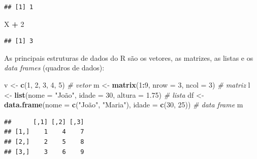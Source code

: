 \documentclass[
]{book}
\newenvironment{Shaded}{\begin{snugshade}}{\end{snugshade}}
\newcommand{\AttributeTok}[1]{\textcolor[rgb]{0.13,0.29,0.53}{#1}}
\newcommand{\CommentTok}[1]{\textcolor[rgb]{0.56,0.35,0.01}{\textit{#1}}}
\newcommand{\DecValTok}[1]{\textcolor[rgb]{0.00,0.00,0.81}{#1}}
\newcommand{\FloatTok}[1]{\textcolor[rgb]{0.00,0.00,0.81}{#1}}
\newcommand{\FunctionTok}[1]{\textcolor[rgb]{0.13,0.29,0.53}{\textbf{#1}}}
\newcommand{\NormalTok}[1]{#1}
\newcommand{\OtherTok}[1]{\textcolor[rgb]{0.56,0.35,0.01}{#1}}
\newcommand{\SpecialCharTok}[1]{\textcolor[rgb]{0.81,0.36,0.00}{\textbf{#1}}}
\newcommand{\StringTok}[1]{\textcolor[rgb]{0.31,0.60,0.02}{#1}}
\begin{document}
\begin{verbatim}
## [1] 1
\end{verbatim}

\begin{Shaded}
\begin{Highlighting}[]
\NormalTok{X }\SpecialCharTok{+} \DecValTok{2}
\end{Highlighting}
\end{Shaded}

\begin{verbatim}
## [1] 3
\end{verbatim}

As principais estruturas de dados do R são os vetores, as matrizes, as listas e os \emph{data frames} (quadros de dados):

\begin{Shaded}
\begin{Highlighting}[]
\NormalTok{v }\OtherTok{\textless{}{-}} \FunctionTok{c}\NormalTok{(}\DecValTok{1}\NormalTok{, }\DecValTok{2}\NormalTok{, }\DecValTok{3}\NormalTok{, }\DecValTok{4}\NormalTok{, }\DecValTok{5}\NormalTok{)                                      }\CommentTok{\# vetor}
\NormalTok{m }\OtherTok{\textless{}{-}} \FunctionTok{matrix}\NormalTok{(}\DecValTok{1}\SpecialCharTok{:}\DecValTok{9}\NormalTok{, }\AttributeTok{nrow =} \DecValTok{3}\NormalTok{, }\AttributeTok{ncol =} \DecValTok{3}\NormalTok{)                        }\CommentTok{\# matriz}
\NormalTok{l }\OtherTok{\textless{}{-}} \FunctionTok{list}\NormalTok{(}\AttributeTok{nome =} \StringTok{"João"}\NormalTok{, }\AttributeTok{idade =} \DecValTok{30}\NormalTok{, }\AttributeTok{altura =} \FloatTok{1.75}\NormalTok{)        }\CommentTok{\# lista}
\NormalTok{df }\OtherTok{\textless{}{-}} \FunctionTok{data.frame}\NormalTok{(}\AttributeTok{nome =} \FunctionTok{c}\NormalTok{(}\StringTok{"João"}\NormalTok{, }\StringTok{"Maria"}\NormalTok{), }\AttributeTok{idade =} \FunctionTok{c}\NormalTok{(}\DecValTok{30}\NormalTok{, }\DecValTok{25}\NormalTok{))   }\CommentTok{\# data frame}
\NormalTok{m}
\end{Highlighting}
\end{Shaded}

\begin{verbatim}
##      [,1] [,2] [,3]
## [1,]    1    4    7
## [2,]    2    5    8
## [3,]    3    6    9
\end{verbatim}

\begin{Shaded}
\end{Shaded}
\end{document}
